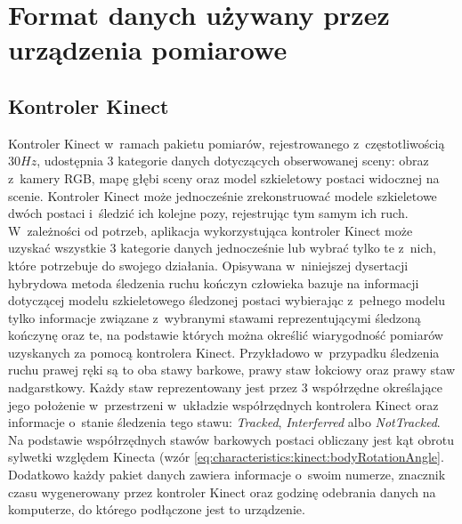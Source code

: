 \section{Format danych używany przez urządzenia pomiarowe}
\subsection{Kontroler Kinect}
Kontroler Kinect w~ramach pakietu pomiarów, rejestrowanego z~częstotliwością $30 Hz$, udostępnia 3 kategorie danych dotyczących obserwowanej sceny: obraz z~kamery RGB, mapę głębi sceny oraz model szkieletowy postaci widocznej na scenie. Kontroler Kinect może jednocześnie zrekonstruować modele szkieletowe dwóch postaci i~śledzić ich kolejne pozy, rejestrując tym samym ich ruch. W~zależności od potrzeb, aplikacja wykorzystująca kontroler Kinect może uzyskać wszystkie 3 kategorie danych jednocześnie lub wybrać tylko te z~nich, które potrzebuje do swojego działania. Opisywana w~niniejszej dysertacji hybrydowa metoda śledzenia ruchu kończyn człowieka bazuje na informacji dotyczącej modelu szkieletowego śledzonej postaci wybierając z~pełnego modelu tylko informacje związane z~wybranymi stawami reprezentującymi śledzoną kończynę oraz te, na podstawie których można określić wiarygodność pomiarów uzyskanych za pomocą kontrolera Kinect. 
Przykładowo w~przypadku śledzenia ruchu prawej ręki są to oba stawy barkowe, prawy staw łokciowy oraz prawy staw nadgarstkowy. Każdy staw reprezentowany jest przez 3 współrzędne określające jego położenie w~przestrzeni w~układzie współrzędnych kontrolera Kinect
oraz informacje o~stanie śledzenia tego stawu: \emph{Tracked}, \emph{Interferred} albo \emph{NotTracked}.
Na podstawie współrzędnych stawów barkowych postaci obliczany jest kąt obrotu sylwetki względem Kinecta (wzór \ref{eq:characteristics:kinect:bodyRotationAngle}. Dodatkowo każdy pakiet danych zawiera informacje o~swoim numerze, znacznik czasu wygenerowany przez kontroler Kinect oraz godzinę odebrania danych na komputerze, do którego podłączone jest to urządzenie.

